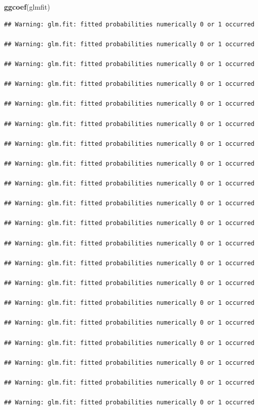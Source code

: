 \documentclass[
]{article}
\newenvironment{Shaded}{\begin{snugshade}}{\end{snugshade}}
\newcommand{\KeywordTok}[1]{\textcolor[rgb]{0.13,0.29,0.53}{\textbf{#1}}}
\newcommand{\NormalTok}[1]{#1}
\begin{document}
\begin{Shaded}
\begin{Highlighting}[]
\KeywordTok{ggcoef}\NormalTok{(glmfit)}
\end{Highlighting}
\end{Shaded}

\begin{verbatim}
## Warning: glm.fit: fitted probabilities numerically 0 or 1 occurred

## Warning: glm.fit: fitted probabilities numerically 0 or 1 occurred

## Warning: glm.fit: fitted probabilities numerically 0 or 1 occurred

## Warning: glm.fit: fitted probabilities numerically 0 or 1 occurred

## Warning: glm.fit: fitted probabilities numerically 0 or 1 occurred

## Warning: glm.fit: fitted probabilities numerically 0 or 1 occurred

## Warning: glm.fit: fitted probabilities numerically 0 or 1 occurred

## Warning: glm.fit: fitted probabilities numerically 0 or 1 occurred

## Warning: glm.fit: fitted probabilities numerically 0 or 1 occurred

## Warning: glm.fit: fitted probabilities numerically 0 or 1 occurred

## Warning: glm.fit: fitted probabilities numerically 0 or 1 occurred

## Warning: glm.fit: fitted probabilities numerically 0 or 1 occurred

## Warning: glm.fit: fitted probabilities numerically 0 or 1 occurred

## Warning: glm.fit: fitted probabilities numerically 0 or 1 occurred

## Warning: glm.fit: fitted probabilities numerically 0 or 1 occurred

## Warning: glm.fit: fitted probabilities numerically 0 or 1 occurred

## Warning: glm.fit: fitted probabilities numerically 0 or 1 occurred

## Warning: glm.fit: fitted probabilities numerically 0 or 1 occurred

## Warning: glm.fit: fitted probabilities numerically 0 or 1 occurred

## Warning: glm.fit: fitted probabilities numerically 0 or 1 occurred
\end{verbatim}
\end{document}
